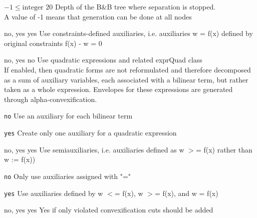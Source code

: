 %
{$-1\leq\textrm{integer}$}%
{$20$}%
{Depth of the B\&B tree where separation is stopped.\\
A value of -1 means that generation can be done at all nodes}%
{}

%
{\ttfamily no, yes}%
{yes}%
{Use constraints-defined auxiliaries, i.e. auxiliaries w = f(x) defined by original constraints f(x) - w = 0}%
{}

%
{\ttfamily no, yes}%
{no}%
{Use quadratic expressions and related exprQuad class\\
If enabled, then quadratic forms are not reformulated and therefore decomposed as a sum of auxiliary variables, each associated with a bilinear term, but rather taken as a whole expression. Envelopes for these expressions are generated through alpha-convexification.}%
{\begin{list}{}{
\setlength{\parsep}{0em}
\setlength{\leftmargin}{5ex}
\setlength{\labelwidth}{2ex}
\setlength{\itemindent}{0ex}
\setlength{\topsep}{0pt}}
\item[\texttt{no}] Use an auxiliary for each bilinear term
\item[\texttt{yes}] Create only one auxiliary for a quadratic expression
\end{list}
}

%
{\ttfamily no, yes}%
{yes}%
{Use semiauxiliaries, i.e. auxiliaries defined as w $>$= f(x) rather than w := f(x))}%
{\begin{list}{}{
\setlength{\parsep}{0em}
\setlength{\leftmargin}{5ex}
\setlength{\labelwidth}{2ex}
\setlength{\itemindent}{0ex}
\setlength{\topsep}{0pt}}
\item[\texttt{no}] Only use auxiliaries assigned with "=" 
\item[\texttt{yes}] Use auxiliaries defined by w $<$= f(x), w $>$= f(x), and w = f(x)
\end{list}
}

%
{\ttfamily no, yes}%
{yes}%
{Yes if only violated convexification cuts should be added}%
{}

